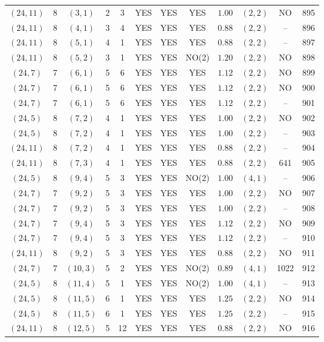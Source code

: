 \begin{longtable}{|c|c|c|c|c|c|c|c|c|c|c|c|}
$(24,11)$ & 8 & $(3,1)$ & 2 & 3 & YES & YES & YES & $1.00$ & $(2,2)$ & NO & 895\\
$(24,11)$ & 8 & $(4,1)$ & 3 & 4 & YES & YES & YES & $0.88$ & $(2,2)$ & -- & 896\\
$(24,11)$ & 8 & $(5,1)$ & 4 & 1 & YES & YES & YES & $0.88$ & $(2,2)$ & -- & 897\\
$(24,11)$ & 8 & $(5,2)$ & 3 & 1 & YES & YES & NO(2) & $1.20$ & $(2,2)$ & NO & 898\\
$(24,7)$ & 7 & $(6,1)$ & 5 & 6 & YES & YES & YES & $1.12$ & $(2,2)$ & NO & 899\\
$(24,7)$ & 7 & $(6,1)$ & 5 & 6 & YES & YES & YES & $1.12$ & $(2,2)$ & NO & 900\\
$(24,7)$ & 7 & $(6,1)$ & 5 & 6 & YES & YES & YES & $1.12$ & $(2,2)$ & -- & 901\\
$(24,5)$ & 8 & $(7,2)$ & 4 & 1 & YES & YES & YES & $1.00$ & $(2,2)$ & NO & 902\\
$(24,5)$ & 8 & $(7,2)$ & 4 & 1 & YES & YES & YES & $1.00$ & $(2,2)$ & -- & 903\\
$(24,11)$ & 8 & $(7,2)$ & 4 & 1 & YES & YES & YES & $0.88$ & $(2,2)$ & -- & 904\\
$(24,11)$ & 8 & $(7,3)$ & 4 & 1 & YES & YES & YES & $0.88$ & $(2,2)$ & 641 & 905\\
$(24,5)$ & 8 & $(9,4)$ & 5 & 3 & YES & YES & NO(2) & $1.00$ & $(4,1)$ & -- & 906\\
$(24,7)$ & 7 & $(9,2)$ & 5 & 3 & YES & YES & YES & $1.00$ & $(2,2)$ & NO & 907\\
$(24,7)$ & 7 & $(9,2)$ & 5 & 3 & YES & YES & YES & $1.00$ & $(2,2)$ & -- & 908\\
$(24,7)$ & 7 & $(9,4)$ & 5 & 3 & YES & YES & YES & $1.12$ & $(2,2)$ & NO & 909\\
$(24,7)$ & 7 & $(9,4)$ & 5 & 3 & YES & YES & YES & $1.12$ & $(2,2)$ & -- & 910\\
$(24,11)$ & 8 & $(9,2)$ & 5 & 3 & YES & YES & YES & $0.88$ & $(2,2)$ & NO & 911\\
$(24,7)$ & 7 & $(10,3)$ & 5 & 2 & YES & YES & NO(2) & $0.89$ & $(4,1)$ & 1022 & 912\\
$(24,5)$ & 8 & $(11,4)$ & 5 & 1 & YES & YES & NO(2) & $1.00$ & $(4,1)$ & -- & 913\\
$(24,5)$ & 8 & $(11,5)$ & 6 & 1 & YES & YES & YES & $1.25$ & $(2,2)$ & NO & 914\\
$(24,5)$ & 8 & $(11,5)$ & 6 & 1 & YES & YES & YES & $1.25$ & $(2,2)$ & -- & 915\\
$(24,11)$ & 8 & $(12,5)$ & 5 & 12 & YES & YES & YES & $0.88$ & $(2,2)$ & NO & 916\\

\end{longtable}
